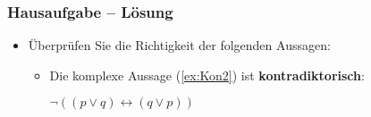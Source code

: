 \begin{frame}
	\frametitle{Hausaufgabe -- Lösung}
	
	\begin{itemize}
		\item Überprüfen Sie die Richtigkeit der folgenden Aussagen:
		
		\vspace{1em}
		
		\begin{itemize}	
			\item Die komplexe Aussage (\ref{ex:Kon2}) ist \textbf{kontradiktorisch}:
			
			\begin{exe}
				 $\lnot ((p \lor q) \leftrightarrow (q \lor p))$
			\end{exe}		
		\end{itemize}	
		
	\end{itemize}
	
	\begin{table}
		\centering	
	\end{table} 
	
	
\end{frame}


